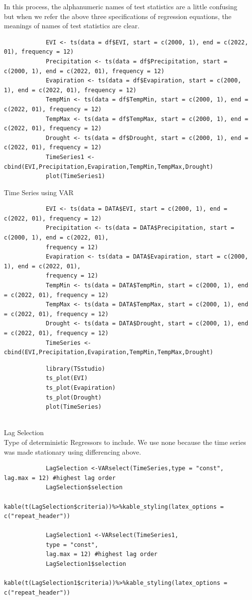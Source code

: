 \documentclass[12pt,a4paper]{book}
\begin{document}
			In this process, the alphanumeric names of test statistics are a little confusing but 
			when we refer the above three specifications of regression equations, the meanings of 
			names of test statistics are clear.
				\begin{verbatim}
			EVI <- ts(data = df$EVI, start = c(2000, 1), end = c(2022, 01), frequency = 12)
			Precipitation <- ts(data = df$Precipitation, start = c(2000, 1), end = c(2022, 01), frequency = 12)
			Evapiration <- ts(data = df$Evapiration, start = c(2000, 1), end = c(2022, 01), frequency = 12)
			TempMin <- ts(data = df$TempMin, start = c(2000, 1), end = c(2022, 01), frequency = 12)
			TempMax <- ts(data = df$TempMax, start = c(2000, 1), end = c(2022, 01), frequency = 12)
			Drought <- ts(data = df$Drought, start = c(2000, 1), end = c(2022, 01), frequency = 12)
			TimeSeries1 <- cbind(EVI,Precipitation,Evapiration,TempMin,TempMax,Drought)
			plot(TimeSeries1)
				\end{verbatim}
	Time Series using  VAR
				\begin{verbatim}
			EVI <- ts(data = DATA$EVI, start = c(2000, 1), end = c(2022, 01), frequency = 12)
			Precipitation <- ts(data = DATA$Precipitation, start = c(2000, 1), end = c(2022, 01),
			frequency = 12)
			Evapiration <- ts(data = DATA$Evapiration, start = c(2000, 1), end = c(2022, 01), 
			frequency = 12)
			TempMin <- ts(data = DATA$TempMin, start = c(2000, 1), end = c(2022, 01), frequency = 12)
			TempMax <- ts(data = DATA$TempMax, start = c(2000, 1), end = c(2022, 01), frequency = 12)
			Drought <- ts(data = DATA$Drought, start = c(2000, 1), end = c(2022, 01), frequency = 12)
			TimeSeries <- cbind(EVI,Precipitation,Evapiration,TempMin,TempMax,Drought)
				\end{verbatim}
	
				\begin{verbatim}
			library(TSstudio)
			ts_plot(EVI)
			ts_plot(Evapiration)
			ts_plot(Drought)
			plot(TimeSeries)
			
				\end{verbatim}
	 Lag Selection \\
	Type of deterministic Regressors to include. We use none because the time series was made stationary using differencing above.
				\begin{verbatim}
			LagSelection <-VARselect(TimeSeries,type = "const", lag.max = 12) #highest lag order
			LagSelection$selection
			kable(t(LagSelection$criteria))%>%kable_styling(latex_options = c("repeat_header"))                
			
			LagSelection1 <-VARselect(TimeSeries1, 
			type = "const",  
			lag.max = 12) #highest lag order
			LagSelection1$selection
			kable(t(LagSelection1$criteria))%>%kable_styling(latex_options = c("repeat_header")) 
				\end{verbatim}
	
\end{document}
